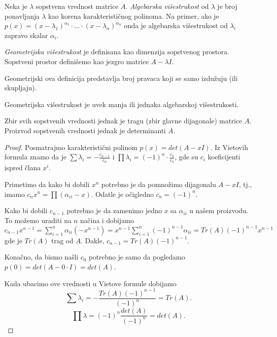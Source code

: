 \documentclass{article}
\begin{document}
\begin{definition}
  Neka je $\lambda$ sopstvena vrednost matrice $A$.
  \textit{Algebarska višestrukost} od $\lambda$ je broj ponavljanja $\lambda$ kao korena karakterističnog polinoma.
  Na primer, ako je $p(x) = (x - \lambda_1)^{\alpha_1} \cdot \ldots \cdot (x - \lambda_n)^{\alpha_n}$ onda je algebarska višestrukost od $\lambda_i$ zapravo skalar $\alpha_i$.
\end{definition}

\begin{definition}
  \textit{Geometrijska višestrukost} je definisana kao dimenzija sopstvenog prostora.
  Sopstveni prostor definišemo kao jezgro matrice $A - \lambda I$.
\end{definition}

Geometrijski ova definicija predstavlja broj pravaca koji se samo izdužuju (ili skupljaju).

\begin{theorem}
  Geometrijska višestrukost je uvek manja ili jednaka algebarskoj višestrukosti.
\end{theorem}

\begin{theorem}
  Zbir svih sopstvenih vrednosti jednak je tragu (zbir glavne dijagonale) matrice $A$.
  Proizvod sopstvenih vrednosti jednak je determinanti $A$.
\end{theorem}

\begin{proof}
  Posmatrajmo karakteristični polinom $p(x) = det(A - x I)$.
  Iz Vietovih formula znamo da je $\sum \lambda_i = -\frac{c_{n - 1}}{c_n}$ i $\prod \lambda_i = (-1)^n \cdot \frac{c_0}{c_n}$, gde su $c_i$ koeficijenti ispred člana $x^i$.

  Primetimo da kako bi dobili $x^n$ potrebno je da pomnožimo dijagonalu $A - x I$, tj., imamo $c_n x^n = \prod (\alpha_{ii} - x)$.
  Odatle je očigledno $c_n = (-1)^n$.

  Kako bi dobili $c_{n - 1}$ potrebno je da zamenimo jedno $x$ sa $\alpha_{ii}$ u našem proizvodu.
  To možemo uraditi na $n$ načina i dobijamo $c_{n - 1} x^{n - 1} = \sum_{i = 1}^{n} \alpha_{ii} (-x^{n - 1}) = x^{n - 1} \sum_{i = 1}^{n} (-1)^{n - 1} \alpha_{ii} = Tr(A) (-1)^{n - 1} x^{n - 1}$ gde je $Tr(A)$ trag od $A$.
  Dakle, $c_{n - 1} = Tr(A) (-1)^{n - 1}$.

  Konačno, da bismo našli $c_0$ potrebno je samo da pogledamo $p(0) = det(A - 0 \cdot I) = det(A)$.

  Kada ubacimo ove vrednosti u Vietove formule dobijamo
  \[\sum \lambda_i = -\frac{Tr(A) (-1)^{n - 1}}{(-1)^n} = Tr(A).\]
  \[\prod \lambda = (-1)^n \frac{det(A)}{(-1)^n} = det(A).\]
\end{proof}
\end{document}
